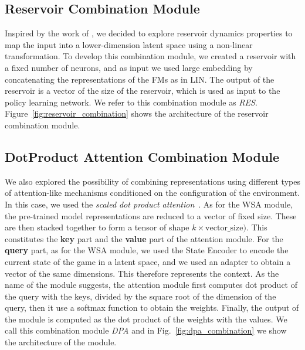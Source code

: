 \subsection{Reservoir Combination Module}
\label{sec:reservoir_combination}
Inspired by the work of \citet{gallicchio2017}, we decided to explore reservoir dynamics properties to map the input into a lower-dimension latent space using a non-linear transformation.
To develop this combination module, we created a reservoir with a fixed number of neurons, and as input we used large embedding by concatenating the representations of the FMs as in LIN\@.
The output of the reservoir is a vector of the size of the reservoir, which is used as input to the policy learning network.
We refer to this combination module as \textit{RES}.
Figure~\ref{fig:reservoir_combination} shows the architecture of the reservoir combination module.

\subsection{DotProduct Attention Combination Module}
\label{sec:dpa}

We also explored the possibility of combining representations using different types of attention-like mechanisms conditioned on the configuration of the environment.
In this case, we used the \textit{scaled dot product attention}~\citep{vaswani2017attention}.
As for the WSA module, the pre-trained model representations are reduced to a vector of fixed size.
These are then stacked together to form a tensor of shape $k \times \text{vector\_size})$.
This constitutes the \textbf{key} part and the \textbf{value} part of the attention module.
For the \textbf{query} part, as for the WSA module, we used the State Encoder to encode the current state of the game in a latent space, and we used an adapter to obtain a vector of the same dimensions.
This therefore represents the context.
As the name of the module suggests, the attention module first computes dot product of the query with the keys, divided by the square root of the dimension of the query, then it use a softmax function to obtain the weights.
Finally, the output of the module is computed as the dot product of the weights with the values.
We call this combination module \textit{DPA} and in Fig.~\ref{fig:dpa_combination} we show the architecture of the module.


